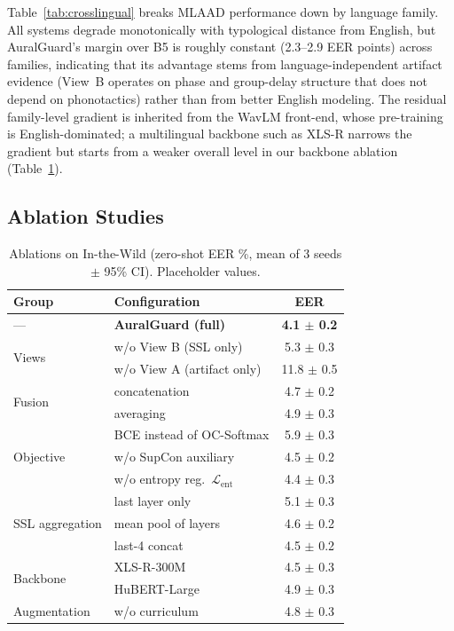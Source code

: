 Table~\ref{tab:crosslingual} breaks MLAAD performance down by language family. All
systems degrade monotonically with typological distance from English, but AuralGuard's
margin over B5 is roughly constant (2.3--2.9 EER points) across families, indicating
that its advantage stems from language-independent artifact evidence (View~B operates
on phase and group-delay structure that does not depend on phonotactics) rather than
from better English modeling. The residual family-level gradient is inherited from the
WavLM front-end, whose pre-training is English-dominated; a multilingual backbone such
as XLS-R narrows the gradient but starts from a weaker overall level in our backbone
ablation (Table~\ref{tab:ablation}).

\subsection{Ablation Studies}
\label{ssec:ablation}

\begin{table}[t]
\centering
\caption{Ablations on In-the-Wild (zero-shot EER \%, mean of 3 seeds $\pm$ 95\% CI).
  Placeholder values.}
\label{tab:ablation}
\setlength{\tabcolsep}{5pt}
\footnotesize
\begin{tabular}{llc}
\toprule
Group & Configuration & EER \\
\midrule
--- & \textbf{AuralGuard (full)} & \textbf{4.1 $\pm$ 0.2} \\
\midrule
\multirow{2}{*}{Views}
 & w/o View B (SSL only)        & 5.3 $\pm$ 0.3 \\
 & w/o View A (artifact only)   & 11.8 $\pm$ 0.5 \\
\midrule
\multirow{2}{*}{Fusion}
 & concatenation                & 4.7 $\pm$ 0.2 \\
 & averaging                    & 4.9 $\pm$ 0.3 \\
\midrule
\multirow{3}{*}{Objective}
 & BCE instead of OC-Softmax    & 5.9 $\pm$ 0.3 \\
 & w/o SupCon auxiliary         & 4.5 $\pm$ 0.2 \\
 & w/o entropy reg.\ $\mathcal{L}_{\text{ent}}$ & 4.4 $\pm$ 0.3 \\
\midrule
\multirow{3}{*}{SSL aggregation}
 & last layer only              & 5.1 $\pm$ 0.3 \\
 & mean pool of layers          & 4.6 $\pm$ 0.2 \\
 & last-4 concat                & 4.5 $\pm$ 0.2 \\
\midrule
\multirow{2}{*}{Backbone}
 & XLS-R-300M                   & 4.5 $\pm$ 0.3 \\
 & HuBERT-Large                 & 4.9 $\pm$ 0.3 \\
\midrule
Augmentation & w/o curriculum   & 4.8 $\pm$ 0.3 \\
\bottomrule
\end{tabular}
\end{table}

